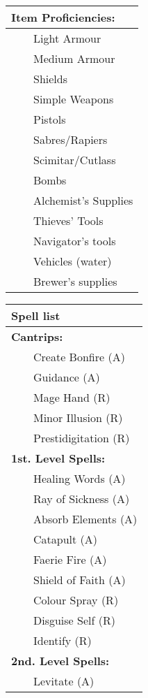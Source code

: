 \documentclass[11pt]{article}
\newcommand{\tabitem}{~~\llap{--}~~}
\begin{document}
\begin{multicols}{2}
\vspace{4mm}

\noindent \begin{tabularx}{\linewidth}{@{}l}
{\Large \textbf{Item Proficiencies:}} \\
\hline
\tabitem Light Armour \\
\tabitem Medium Armour \\
\tabitem Shields \\
\tabitem Simple Weapons \\
\tabitem Pistols \\
\tabitem Sabres/Rapiers \\
\tabitem Scimitar/Cutlass \\
\tabitem Bombs \\
\tabitem Alchemist's Supplies \\
\tabitem Thieves' Tools \\
\tabitem Navigator's tools \\
\tabitem Vehicles (water) \\
\tabitem Brewer's supplies
		\end{tabularx}

\vspace{4mm}

\noindent \begin{tabularx}{\linewidth}{@{}l}
{\Large \textbf{Spell list}} 			\\
\hline
\textbf{Cantrips:}	 					\\
\tabitem Create Bonfire (A)			 	\\
\tabitem Guidance (A)					\\
\tabitem Mage Hand (R)					\\
\tabitem Minor Illusion (R)				\\
\tabitem Prestidigitation (R)			\\

\textbf{1st. Level Spells:}				\\
\tabitem Healing Words (A)				\\
\tabitem Ray of Sickness	(A)			\\
\tabitem Absorb Elements	(A) 		\\
\tabitem Catapult (A)					\\
\tabitem Faerie Fire (A)				\\
\tabitem Shield of Faith	(A)	 		\\
\tabitem Colour Spray (R)				\\
\tabitem Disguise Self (R)				\\
\tabitem Identify (R)					\\

\textbf{2nd. Level Spells:}				\\
\tabitem Levitate (A)
		\end{tabularx}
	\end{multicols}
\end{document}
